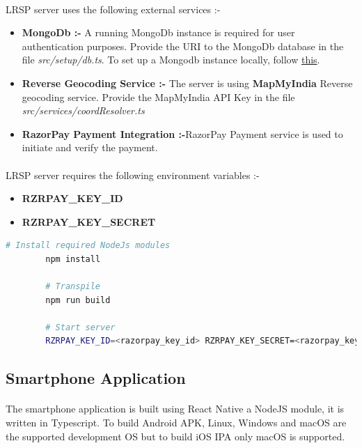 \documentclass{article}
\begin{document}
        \paragraph{}
        LRSP server uses the following external services :-
        \begin{itemize}
            \item \textbf{MongoDb :-} A running MongoDb instance is required for user authentication purposes. Provide the URI to the MongoDb database in the file \textit{src/setup/db.ts}. To set up a Mongodb instance locally, follow \href{https://docs.mongodb.com/manual/installation/}{this}.
            \item \textbf{Reverse Geocoding Service :-} The server is using \textbf{MapMyIndia} Reverse geocoding service. Provide the MapMyIndia API Key in the file \textit{src/services/coordResolver.ts}
            \item \textbf{RazorPay Payment Integration :-}RazorPay Payment service is used to initiate and verify the payment.
        \end{itemize}
    
        \paragraph{}
        LRSP server requires the following environment variables :-
        \begin{itemize}
            \item \textbf{RZRPAY\_KEY\_ID}
            \item \textbf{RZRPAY\_KEY\_SECRET}
        \end{itemize}
        
        \begin{lstlisting}[language=bash, caption=LRSP Server]
        # Install required NodeJs modules
        npm install
    
        # Transpile
        npm run build
    
        # Start server
        RZRPAY_KEY_ID=<razorpay_key_id> RZRPAY_KEY_SECRET=<razorpay_key_secret> node dist/main.js
        \end{lstlisting}
    
    \subsection{Smartphone Application}
        \paragraph{}
        The smartphone application is built using React Native a NodeJS module, it is written in Typescript. To build Android APK, Linux, Windows and macOS are the supported development OS but to build iOS IPA only macOS is supported.
\end{document}
